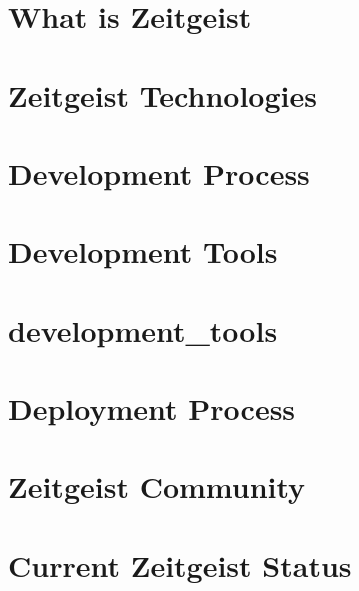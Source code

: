 \documentclass[10pt]{book}
\begin{document}


\tableofcontents

\chapter{What is Zeitgeist}


\chapter{Zeitgeist Technologies}


\chapter{Development Process}


\chapter{Development Tools}
\chapter{development_tools}

\chapter{Deployment Process}

\chapter{Zeitgeist Community}

\chapter{Current Zeitgeist Status}
\end{document}
